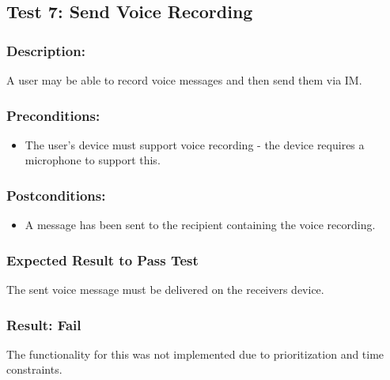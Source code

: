\documentclass[11pt]{article}
\begin{document}
\subsection{Test 7: Send Voice Recording}
\subsubsection{Description:}
A user may be able to record voice messages and then send them via IM.
\subsubsection{Preconditions:} 
\begin{itemize}
\item The user's device must support voice recording - the device requires a microphone to support this.
\end{itemize}
\subsubsection{Postconditions:}
\begin{itemize}
\item A message has been sent to the recipient containing the voice recording.
\end{itemize}
\subsubsection{Expected Result to Pass Test}
The sent voice message must be delivered on the receivers device.
\subsubsection{Result: Fail}
The functionality for this was not implemented due to prioritization and time constraints.
\end{document}
